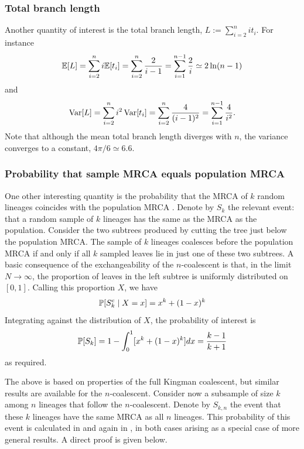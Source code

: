 \subsubsection{Total branch length}
Another quantity of interest is the total branch length,
$ L := \sum_{i=2}^n i t_i $.
For instance
\begin{equation}
\E[ L ] 
= \sum_{i=2}^n i \E[ t_i ]
= \sum_{i=2}^n \frac{2}{i-1}
= \sum_{i=1}^{n-1} \frac{2}{i} %
\simeq 2 \ln(n-1) 
\end{equation}
and
\begin{equation}
\operatorname{Var}[ L ] 
= \sum_{i=2}^n i^2 \operatorname{Var}[ t_i ]
= \sum_{i=2}^n \frac{4}{(i-1)^2}
= \sum_{i=1}^{n-1} \frac{4}{i^2} .
\end{equation}
Note that although the mean total branch length diverges with $n$, the variance converges to a constant, $4\pi /6 \simeq 6.6$.


\subsubsection{Probability that sample MRCA equals population MRCA}
One other interesting quantity is the probability that the MRCA of $k$ random lineages coincides with the population MRCA \parencite[e.g.][Theorem 1.7]{durrett2008}.
Denote by $S_k$ the relevant event: that a random sample of $k$ lineages has the same as the MRCA as the population.
Consider the two subtrees produced by cutting the tree just below the population MRCA. The sample of $k$ lineages coalesces before the population MRCA if and only if all $k$ sampled leaves lie in just one of these two subtrees.
A basic consequence of the exchangeability of the $n$-coalescent is that, in the limit $N\to\infty$, the proportion of leaves in the left subtree is uniformly distributed on $[0,1]$.
Calling this proportion $X$, we have
\begin{equation*}
\mathbb{P} [ S_k^c \mid X=x]
= x^k + (1-x)^k
\end{equation*}
Integrating against the distribution of $X$, the probability of interest is
\begin{equation*}
\mathbb{P}[ S_k ]
= 1- \int_0^1 [ x^k + (1-x)^k ] dx
= \frac{k-1}{k+1}
\end{equation*}
as required.

The above is based on properties of the full Kingman coalescent, but similar results are available for the $n$-coalescent.
Consider now a subsample of size $k$ among $n$ lineages that follow the $n$-coalescent.
Denote by $S_{k,n}$ the event that these $k$ lineages have the same MRCA as all $n$ lineages.
This probability of this event is calculated in \textcite[Example 1]{saunders1984} and again in \textcite[Equation (3)]{spouge2014}, in both cases arising as a special case of more general results. A direct proof is given below.

